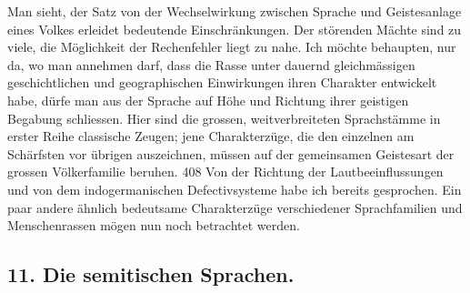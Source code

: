 Man sieht, der Satz von der Wechselwirkung zwischen Sprache und Geistesanlage eines Volkes erleidet bedeutende Einschränkungen. Der störenden Mächte sind zu viele, die Möglichkeit der Rechenfehler liegt zu nahe. Ich möchte behaupten, nur da, wo man annehmen darf, dass die Rasse unter dauernd gleichmässigen geschichtlichen und geographischen Einwirkungen ihren Charakter entwickelt habe, dürfe man aus der Sprache auf Höhe und Richtung ihrer geistigen Begabung schliessen. Hier sind die grossen, weitverbreiteten Sprachstämme in erster Reihe classische Zeugen; jene Charakterzüge, die den einzelnen am Schärfsten vor  übrigen auszeichnen, müssen auf der gemeinsamen Geistesart der grossen Völkerfamilie beruhen. 408{\textbar}{\textbar}\label{sp.408} Von der Richtung der Lautbeeinflussungen und von dem indogermanischen Defectivsysteme habe ich bereits gesprochen. Ein paar andere ähnlich bedeutsame Charakterzüge verschiedener Sprachfamilien und Menschenrassen mögen nun noch betrachtet werden.

\subsection*{11. Die semitischen Sprachen.}\label{IV.IV.11}

